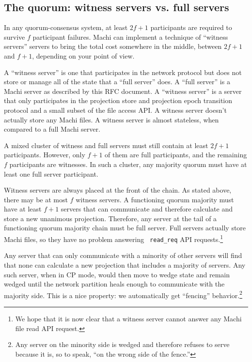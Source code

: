 \documentclass[preprint,10pt]{sigplanconf}
\begin{document}
\subsection{The quorum: witness servers vs. full servers}

In any quorum-consensus system, at least $2f+1$ participants are
required to survive $f$ participant failures.  Machi can implement a
technique of ``witness servers'' servers to bring the total cost
somewhere in the middle, between $2f+1$ and $f+1$, depending on your
point of view.

A ``witness server'' is one that participates in the network protocol
but does not store or manage all of the state that a ``full server''
does.  A ``full server'' is a Machi server as
described by this RFC document.  A ``witness server'' is a server that
only participates in the projection store and projection epoch
transition protocol and a small subset of the file access API.
A witness server doesn't actually store any
Machi files.  A witness server is almost stateless, when compared to a
full Machi server.

A mixed cluster of witness and full servers must still contain at
least $2f+1$ participants.  However, only $f+1$ of them are full
participants, and the remaining $f$ participants are witnesses.  In
such a cluster, any majority quorum must have at least one full server
participant.

Witness servers are always placed at the front of the chain.  As stated
above, there may be at most $f$ witness servers.  A functioning quorum
majority
must have at least $f+1$ servers that can communicate and therefore
calculate and store a new unanimous projection.  Therefore, any server at
the tail of a functioning quorum majority chain must be full server.  Full servers
actually store Machi files, so they have no problem answering {\tt
  read\_req} API requests.\footnote{We hope that it is now clear that
  a witness server cannot answer any Machi file read API request.}

Any server that can only communicate with a minority of other servers will
find that none can calculate a new projection that includes a
majority of servers.  Any such server, when in CP mode, would then move to
wedge state and remain wedged until the network partition heals enough
to communicate with the majority side.  This is a nice property: we
automatically get ``fencing'' behavior.\footnote{Any server on the minority side
  is wedged and therefore refuses to serve because it is, so to speak,
  ``on the wrong side of the fence.''}
\end{document}
